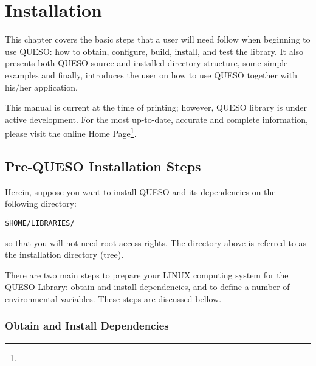 \chapter{Installation}\label{ch-install}
\thispagestyle{headings}


  
This chapter covers the basic steps that a user will need follow when beginning to use QUESO: 
how to obtain, configure, build, install, and test the library.  It also presents both QUESO source and installed directory structure, some simple examples and finally,  introduces the user on how to use QUESO together with his/her application.

This manual is current at the time of
printing; however, QUESO library  is under active development. For the most up-to-date, accurate and complete information,
please visit the online \Queso{} Home Page\footnote{\Quesoweb}.



        
\section{Pre-QUESO Installation Steps}\label{sec:Pre_Queso}


Herein, suppose you want to install QUESO and its dependencies on the following directory:
\begin{lstlisting}
$HOME/LIBRARIES/
\end{lstlisting}
%
so that you will not need root access rights. The directory above is referred to as the \Queso{} installation directory (tree).

There are two main steps to prepare your LINUX computing system  for  the QUESO Library: obtain and install \Queso{} dependencies, and to define a number of environmental variables. These steps are discussed bellow.


\subsection{Obtain and Install \Queso{} Dependencies}

